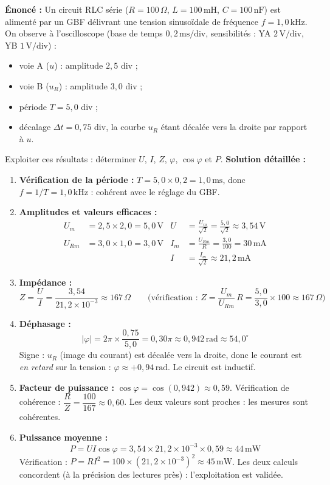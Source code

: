 \documentclass[11pt]{article}
\begin{document}
\begin{exoresolu}
\textbf{Énoncé :} Un circuit RLC série ($R = 100\,\Omega$, $L = 100\,\text{mH}$, $C = 100\,\text{nF}$) est alimenté par un GBF délivrant une tension sinusoïdale de fréquence $f = 1{,}0\,\text{kHz}$. On observe à l'oscilloscope (base de temps $0{,}2\,\text{ms/div}$, sensibilités : YA $2\,\text{V/div}$, YB $1\,\text{V/div}$) :
\begin{itemize}
    \item voie A ($u$) : amplitude $2{,}5$ div ;
    \item voie B ($u_R$) : amplitude $3{,}0$ div ;
    \item période $T = 5{,}0$ div ;
    \item décalage $\Delta t = 0{,}75$ div, la courbe $u_R$ étant décalée vers la droite par rapport à $u$.
\end{itemize}
Exploiter ces résultats : déterminer $U$, $I$, $Z$, $\varphi$, $\cos\varphi$ et $P$.
\tcblower
\textbf{Solution détaillée :}
\begin{enumerate}
    \item \textbf{Vérification de la période :} $T = 5{,}0 \times 0{,}2 = 1{,}0\,\text{ms}$, donc $f = 1/T = 1{,}0\,\text{kHz}$ : cohérent avec le réglage du GBF.
    \item \textbf{Amplitudes et valeurs efficaces :}
    \begin{align*}
    U_m &= 2{,}5 \times 2{,}0 = 5{,}0\,\text{V} & U &= \frac{U_m}{\sqrt{2}} = \frac{5{,}0}{\sqrt{2}} \approx 3{,}54\,\text{V}\\
    U_{Rm} &= 3{,}0 \times 1{,}0 = 3{,}0\,\text{V} & I_m &= \frac{U_{Rm}}{R} = \frac{3{,}0}{100} = 30\,\text{mA}\\
    & & I &= \frac{I_m}{\sqrt{2}} \approx 21{,}2\,\text{mA}
    \end{align*}
    \item \textbf{Impédance :}
    \[
    Z = \frac{U}{I} = \frac{3{,}54}{21{,}2\times10^{-3}} \approx 167\,\Omega
    \qquad \text{(vérification : } Z = \frac{U_m}{U_{Rm}}\,R = \frac{5{,}0}{3{,}0}\times 100 \approx 167\,\Omega\text{)}
    \]
    \item \textbf{Déphasage :}
    \[
    |\varphi| = 2\pi \times \frac{0{,}75}{5{,}0} = 0{,}30\pi \approx 0{,}942\,\text{rad} \approx 54{,}0^\circ
    \]
    Signe : $u_R$ (image du courant) est décalée vers la droite, donc le courant est \emph{en retard} sur la tension : $\varphi \approx +0{,}94\,\text{rad}$. Le circuit est inductif.
    \item \textbf{Facteur de puissance :} $\cos\varphi = \cos(0{,}942) \approx 0{,}59$.
    Vérification de cohérence : $\dfrac{R}{Z} = \dfrac{100}{167} \approx 0{,}60$. Les deux valeurs sont proches : les mesures sont cohérentes.
    \item \textbf{Puissance moyenne :}
    \[
    P = U I \cos\varphi = 3{,}54 \times 21{,}2\times10^{-3} \times 0{,}59 \approx 44\,\text{mW}
    \]
    Vérification : $P = R I^2 = 100 \times (21{,}2\times10^{-3})^2 \approx 45\,\text{mW}$. Les deux calculs concordent (à la précision des lectures près) : l'exploitation est validée.
\end{enumerate}
\end{exoresolu}
\end{document}
